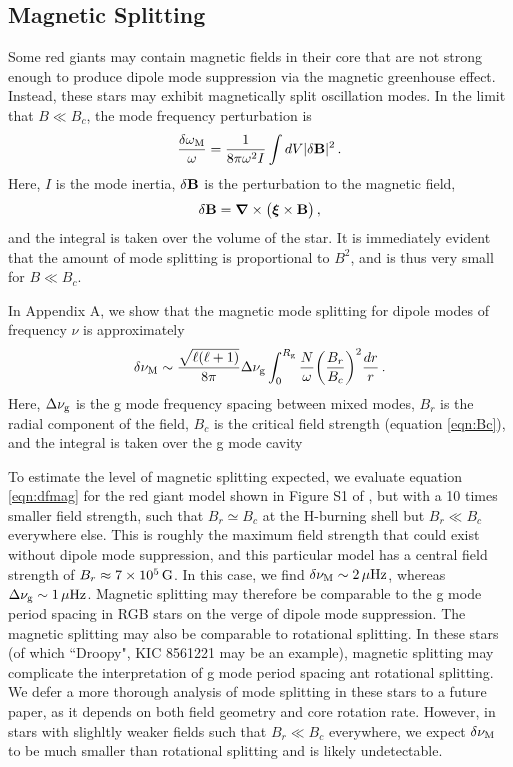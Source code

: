 \subsection{Magnetic Splitting}

Some red giants may contain magnetic fields in their core that are not strong enough to produce dipole mode suppression via the magnetic greenhouse effect. Instead, these stars may exhibit magnetically split oscillation modes. In the limit that $B \ll B_c$, the mode frequency perturbation is \citep{Unno_1989}
\begin{equation}
\label{eqn:dommag}
\frac{\delta \omega_{\rm M}}{\omega} = \frac{1}{8 \pi \omega^2 I} \int d V | \delta {\bf B} |^2 \, .
\end{equation}
Here, $I$ is the mode inertia,  $\delta {\bf B}$ is the perturbation to the magnetic field,
\begin{equation}
\label{eqn:dB}
\delta {\bf B} = {\boldsymbol \nabla} \times \big( {\boldsymbol \xi} \times {\bf B} \big) \, ,
\end{equation}
and the integral is taken over the volume of the star. It is immediately evident that the amount of mode splitting is proportional to $B^2$, and is thus very small for $B \ll B_c$.

In Appendix A, we show that the magnetic mode splitting for dipole modes of frequency $\nu$ is approximately
\begin{equation}
\label{eqn:dfmag}
\delta \nu_{\rm M} \sim \frac{\sqrt{\ell(\ell+1)}}{8 \pi} \Delta \nu_{\rm g} \int^{R_{\rm g}}_0 \frac{N}{\omega} \bigg(\frac{B_r}{B_c}\bigg)^2 \frac{dr}{r} \, .
\end{equation}
Here, $\Delta \nu_{\rm g}$ is the g mode frequency spacing between mixed modes, $B_r$ is the radial component of the field, $B_c$ is the critical field strength (equation \ref{eqn:Bc}), and the integral is taken over the g mode cavity

To estimate the level of magnetic splitting expected, we evaluate equation \ref{eqn:dfmag} for the red giant model shown in Figure S1 of \cite{Fuller_2015}, but with a 10 times smaller field strength, such that $B_r \simeq B_c$ at the H-burning shell but $B_r \ll B_c$ everywhere else. This is roughly the maximum field strength that could exist without dipole mode suppression, and this particular model has a central field strength of $B_r \approx 7 \times 10^5 \, {\rm G}$.  In this case, we find $\delta \nu_{\rm M} \sim 2 \, \mu {\rm Hz}$, whereas $\Delta \nu_{\rm g} \sim 1 \, \mu{\rm Hz}$. Magnetic splitting may therefore be comparable to the g mode period spacing in RGB stars on the verge of dipole mode suppression. The magnetic splitting may also be comparable to rotational splitting. In these stars (of which ``Droopy", KIC 8561221 \cite{Garcia_2014} may be an example), magnetic splitting may complicate the interpretation of g mode period spacing ant rotational splitting. We defer a more thorough analysis of mode splitting in these stars to a future paper, as it depends on both field geometry and core rotation rate. However, in stars with slighltly weaker fields such that $B_r \ll B_c$ everywhere, we expect $\delta \nu_{\rm M}$ to be much smaller than rotational splitting and is likely undetectable. 





